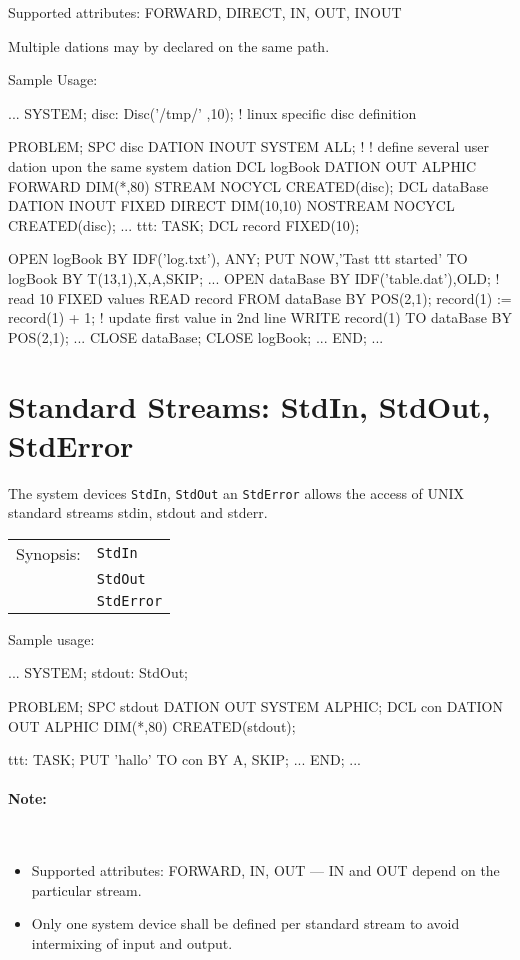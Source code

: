 Supported attributes: FORWARD, DIRECT, IN, OUT, INOUT

Multiple dations may by declared on the same path.


Sample Usage:
\begin{PEARLCode}
...
SYSTEM;
   disc: Disc('/tmp/' ,10); ! linux specific disc definition

PROBLEM;
   SPC disc DATION INOUT SYSTEM ALL;
   !
   ! define several user dation upon the same system dation
   DCL logBook DATION OUT ALPHIC FORWARD DIM(*,80)
                      STREAM NOCYCL CREATED(disc);
   DCL dataBase DATION INOUT FIXED DIRECT DIM(10,10) 
                      NOSTREAM NOCYCL CREATED(disc);
...
ttt: TASK;
   DCL record FIXED(10);

   OPEN logBook BY IDF('log.txt'), ANY;
   PUT NOW,'Tast ttt started' TO logBook BY T(13,1),X,A,SKIP;
...
   OPEN dataBase BY IDF('table.dat'),OLD;
   ! read 10 FIXED values
   READ record FROM dataBase BY POS(2,1);
   record(1) := record(1) + 1;
   ! update first value in 2nd line
   WRITE record(1) TO dataBase BY POS(2,1);
...
   CLOSE dataBase;
   CLOSE logBook;
...
END;
...
\end{PEARLCode}

\section{Standard Streams: StdIn, StdOut, StdError}
The system devices \verb|StdIn|,
\verb|StdOut| an \verb|StdError| allows the access of UNIX standard streams
stdin, stdout and stderr.

\begin{tabular}{ll}
Synopsis: & \verb|StdIn| \\
          & \verb|StdOut| \\
          & \verb|StdError| \\
\end{tabular}

Sample usage:
\begin{PEARLCode}
...
SYSTEM;
  stdout: StdOut;

PROBLEM;
   SPC stdout DATION OUT SYSTEM ALPHIC;
   DCL con    DATION OUT ALPHIC DIM(*,80) CREATED(stdout);

ttt: TASK;
   PUT 'hallo' TO con BY A, SKIP;
...
END;
...
\end{PEARLCode}

\paragraph{Note:}\ 
\begin{itemize}
\item Supported attributes: FORWARD, IN, OUT --- IN and OUT depend on the
particular stream.
\item Only one system device shall be defined per standard stream to avoid
intermixing of input and output.
\end{itemize}

